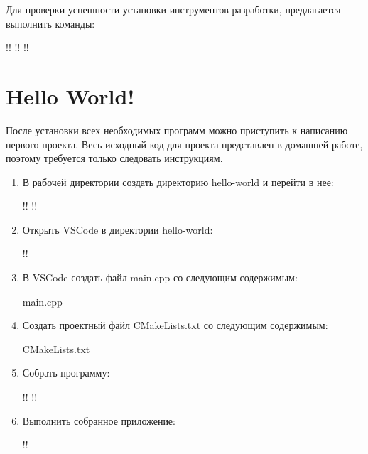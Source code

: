 \documentclass[14pt]{extarticle}
\begin{document}
Для проверки успешности установки инструментов разработки, предлагается выполнить команды:

\begin{terminalwindow}
!!
!!
!!
\end{terminalwindow}

\section{Hello World!}

После установки всех необходимых программ можно приступить к написанию первого проекта.
Весь исходный код для проекта представлен в домашней работе, поэтому требуется только следовать
инструкциям.

\begin{enumerate}

        \item В рабочей директории создать директорию hello-world и перейти в нее:

            \begin{terminalwindow}
!!
!!
            \end{terminalwindow}

        \item Открыть VSCode в директории hello-world:

            \begin{terminalwindow}
!!
            \end{terminalwindow}

        \item В VSCode создать файл main.cpp со следующим содержимым:

                {main.cpp}

        \item Создать проектный файл CMakeLists.txt со следующим содержимым:

                {CMakeLists.txt}

        \item Собрать программу:

            \begin{terminalwindow}
!!
!!
            \end{terminalwindow}

        \item Выполнить собранное приложение:

            \begin{terminalwindow}
!!
            \end{terminalwindow}

\end{enumerate}
\end{document}
